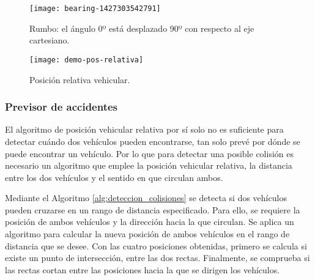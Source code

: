 \begin{figure}[h]
	\begin{center}
		\texttt{[image: bearing-1427303542791]}
		\caption{Rumbo: el ángulo 0º está desplazado 90º con respecto al eje cartesiano.}
		\label{figure:rumbo_gps}
	\end{center}
\end{figure}
\begin{figure}[h]
	\begin{center}
		\texttt{[image: demo-pos-relativa]}
		\caption{Posición relativa vehicular.}
		\label{figure:demo_pos_relativa}
	\end{center}
\end{figure}
\subsubsection{Previsor de accidentes}
El algoritmo de posición vehicular relativa por sí solo no es suficiente para
detectar cuándo dos vehículos pueden encontrarse, tan solo prevé por dónde se
puede encontrar un vehículo. Por lo que para detectar una posible colisión es
necesario un algoritmo que emplee la posición vehicular relativa, la distancia
entre los dos vehículos y el sentido en que circulan ambos.

Mediante el Algoritmo \ref{alg:deteccion_colisiones} se detecta si dos
vehículos pueden cruzarse en un rango de distancia especificado. Para ello,
se requiere la posición de ambos vehículos y la dirección hacia la que
circulan. Se aplica un algoritmo para calcular la nueva posición de ambos
vehículos en el rango de distancia que se desee. Con las cuatro posiciones
obtenidas, primero se calcula si existe un punto de intersección, entre las
dos rectas. Finalmente, se comprueba si las rectas cortan entre las posiciones
hacia la que se dirigen los vehículos.
\FloatBarrier
